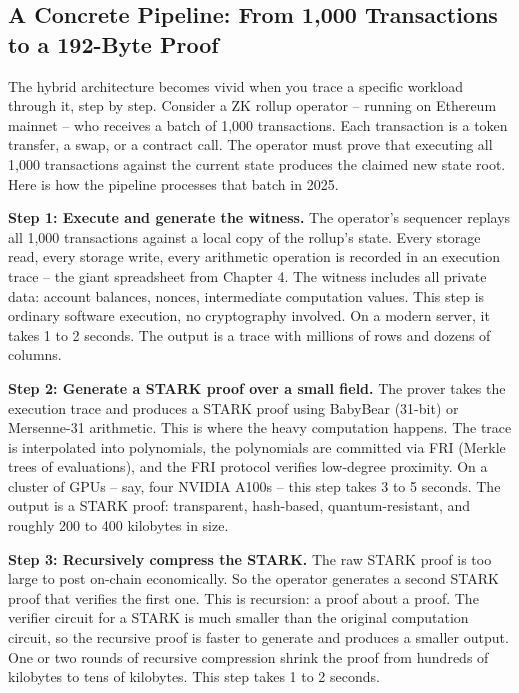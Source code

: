 \documentclass[
  11pt,
  openany]{report}
\renewcommand{\textbf}[1]{{\bfseries\color{MidnightBold}#1}}
\begin{document}
\subsection{A Concrete Pipeline: From 1,000 Transactions to a 192-Byte
Proof}\label{a-concrete-pipeline-from-1000-transactions-to-a-192-byte-proof}

The hybrid architecture becomes vivid when you trace a specific workload through
it, step by step. Consider a ZK rollup operator -- running on Ethereum mainnet
-- who receives a batch of 1,000 transactions. Each transaction is a token
transfer, a swap, or a contract call. The operator must prove that executing all
1,000 transactions against the current state produces the claimed new state
root. Here is how the pipeline processes that batch in 2025.

\textbf{Step 1: Execute and generate the witness.} The operator's sequencer
replays all 1,000 transactions against a local copy of the rollup's state. Every
storage read, every storage write, every arithmetic operation is recorded in an
execution trace -- the giant spreadsheet from Chapter 4. The witness includes
all private data: account balances, nonces, intermediate computation values.
This step is ordinary software execution, no cryptography involved. On a modern
server, it takes 1 to 2 seconds. The output is a trace with millions of rows and
dozens of columns.

\textbf{Step 2: Generate a STARK proof over a small field.} The prover takes the
execution trace and produces a STARK proof using BabyBear (31-bit) or
Mersenne-31 arithmetic. This is where the heavy computation happens. The trace
is interpolated into polynomials, the polynomials are committed via FRI (Merkle
trees of evaluations), and the FRI protocol verifies low-degree proximity. On a
cluster of GPUs -- say, four NVIDIA A100s -- this step takes 3 to 5 seconds. The
output is a STARK proof: transparent, hash-based, quantum-resistant, and roughly
200 to 400 kilobytes in size.

\textbf{Step 3: Recursively compress the STARK.} The raw STARK proof is too
large to post on-chain economically. So the operator generates a second STARK
proof that verifies the first one. This is recursion: a proof about a proof. The
verifier circuit for a STARK is much smaller than the original computation
circuit, so the recursive proof is faster to generate and produces a smaller
output. One or two rounds of recursive compression shrink the proof from
hundreds of kilobytes to tens of kilobytes. This step takes 1 to 2 seconds.
\end{document}
